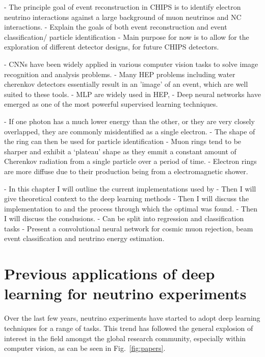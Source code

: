 - The principle goal of event reconstruction in CHIPS is to identify electron neutrino
interactions against a large background of muon neutrinos and NC interactions.
- Explain the goals of both event reconstruction and event classification/ particle identification
- Main purpose for now is to allow for the exploration of different detector designs, for future
CHIPS detectors.

- CNNs have been widely applied in various computer vision tasks to solve image recognition and
analysis problems.
- Many HEP problems including water cherenkov detectors essentially result in an 'image' of an
event, which are well suited to these tools.
- MLP are widely used in HEP,
- Deep neural networks have emerged as one of the most powerful supervised learning techniques.

- If one photon has a much lower energy than the other, or they are very closely overlapped,
they are commonly misidentified as a single electron.
- The shape of the ring can then be used for particle identification
- Muon rings tend to be sharper and exhibit a `plateau' shape as they emmit a constant amount of
Cherenkov radiation from a single particle over a period of time.
- Electron rings are more diffuse due to their production being from a electromagnetic shower.

- In this chapter I will outline the current implementations used by \chips
- Then I will give theoretical context to the deep learning methods
- Then I will discuss the implementation to \chips and the process through which the optimal
was found.
- Then I will discuss the conslusions.
- Can be split into regression and classification tasks
- Present a convolutional neural network for cosmic muon rejection, beam event classification and
neutrino energy estimation.

\section{Previous applications of deep learning for neutrino experiments} %
\label{sec:cvn_previous} %

Over the last few years, neutrino experiments have started to adopt deep learning techniques for a
range of tasks. This trend has followed the general explosion of interest in the field amongst the
global research community, especially within computer vision, as can be seen in
Fig.~\ref{fig:papers}.


